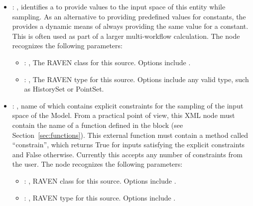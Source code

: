 \begin{itemize}
    \item {}: , 
      identifies a  to provide  values to the input
      space of this entity while sampling. As an alternative to providing predefined values
      for constants, the  provides a dynamic means of always providing
      the same value for a constant. This is often used as part of a larger multi-workflow
      calculation.
      The  node recognizes the following parameters:
        \begin{itemize}
          \item {}: , 
            The RAVEN class for this source. Options include .
          \item {}: , 
            The RAVEN type for this source. Options include any valid  type,
            such as HistorySet or PointSet.
      \end{itemize}

    \item {}: , 
      name of  which contains explicit constraints for the sampling of
      the input space of the Model. From a practical point of view, this XML node must contain
      the name of a function defined in the  block (see
      Section~\ref{sec:functions}).               This external function must contain a method
      called ``constrain'', which returns True for               inputs satisfying the explicit
      constraints and False otherwise. \nb Currently this accepts any number of constraints from the
      user.
      The  node recognizes the following parameters:
        \begin{itemize}
          \item {}: , 
            RAVEN class for this source. Options include .
          \item {}: , 
            RAVEN type for this source. Options include .
      \end{itemize}


\end{itemize}
